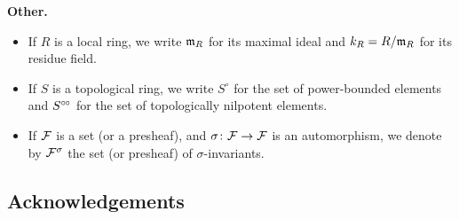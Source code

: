 \documentclass[../main.tex]{subfiles}
\begin{document}
\textbf{Other.}\vspace{-1em}
\begin{itemize}
  \item If $R$ is a local ring, we write $\mathfrak{m}_R$ for its maximal ideal and 
    $k_R = R/\mathfrak{m}_R$ for its residue field. 
  \item If $S$ is a topological ring, we write $S^\circ$ for the set of power-bounded
    elements and $S^{\circ \hspace{-0.5pt} \circ}$ for the set of topologically nilpotent elements.
  \item If $\mathcal{F}$ is a set (or a presheaf), and $\sigma\colon \mathcal{F} \to \mathcal{F}$ is an
    automorphism, we denote by $\mathcal{F}^\sigma$ the set (or presheaf) of 
    $\sigma$-invariants.
\end{itemize}


\subsection*{Acknowledgements} %

\end{document}
